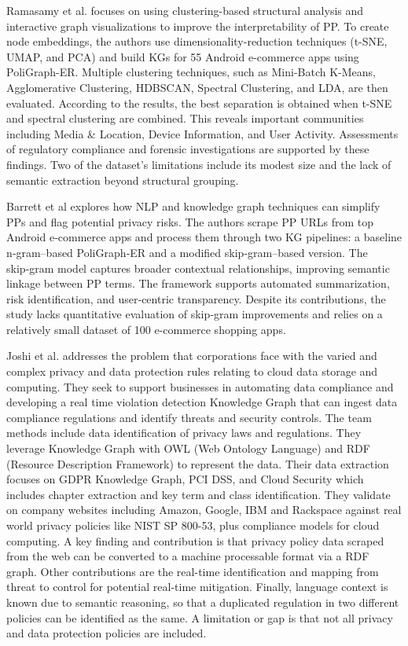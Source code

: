 \documentclass[conference]{IEEEtran}
\begin{document}
Ramasamy et al. \cite{ramasamy2025} focuses on using clustering-based structural analysis and interactive graph visualizations to improve the interpretability of PP. To create node embeddings, the authors use dimensionality-reduction techniques (t-SNE, UMAP, and PCA) and build KGs for 55 Android e-commerce apps using PoliGraph-ER. Multiple clustering techniques, such as Mini-Batch K-Means, Agglomerative Clustering, HDBSCAN, Spectral Clustering, and LDA, are then evaluated. According to the results, the best separation is obtained when t-SNE and spectral clustering are combined. This reveals important communities including Media & Location, Device Information, and User Activity. Assessments of regulatory compliance and forensic investigations are supported by these findings. Two of the dataset's limitations include its modest size and the lack of semantic extraction beyond structural grouping.

Barrett et al \cite{barrett2025} explores how NLP and knowledge graph techniques can simplify PPs and flag potential privacy risks. The authors scrape PP URLs from top Android e‑commerce apps and process them through two KG pipelines: a baseline n‑gram–based PoliGraph‑ER and a modified skip‑gram–based version. The skip‑gram model captures broader contextual relationships, improving semantic linkage between PP terms. The framework supports automated summarization, risk identification, and user‑centric transparency. Despite its contributions, the study lacks quantitative evaluation of skip‑gram improvements and relies on a relatively small dataset of 100 e-commerce shopping apps.


Joshi et al. \cite{joshi2020} addresses the problem that corporations face with the varied and complex privacy and data protection rules relating to cloud data storage and computing. They seek to support businesses in automating data compliance and developing a real time violation detection Knowledge Graph that can ingest data compliance regulations and identify threats and security controls. The team methods include data identification of privacy laws and regulations. They leverage Knowledge Graph with OWL (Web Ontology Language) and RDF (Resource Description Framework) to represent the data. Their data extraction focuses on GDPR Knowledge Graph, PCI DSS, and Cloud Security which includes chapter extraction and key term and class identification. They validate on company websites including Amazon, Google, IBM and Rackspace against real world privacy policies like NIST SP 800-53, plus compliance models for cloud computing. A key finding and contribution is that privacy policy data scraped from the web can be converted to a machine processable format via a RDF graph. Other contributions are the real-time identification and mapping from threat to control for potential real-time mitigation. Finally, language context is known due to semantic reasoning, so that a duplicated regulation in two different policies can be identified as the same. A limitation or gap is that not all privacy and data protection policies are included. 
\end{document}
